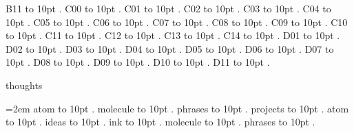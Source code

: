 \smallskip
B11 \leaders\hbox to 10pt {\hss.\hss}  \hfill {}
\smallskip
C00 \leaders\hbox to 10pt {\hss.\hss}  \hfill {}
\smallskip
C01 \leaders\hbox to 10pt {\hss.\hss}  \hfill {}
\smallskip
C02 \leaders\hbox to 10pt {\hss.\hss}  \hfill {}
\smallskip
C03 \leaders\hbox to 10pt {\hss.\hss}  \hfill {}
\smallskip
C04 \leaders\hbox to 10pt {\hss.\hss}  \hfill {}
\smallskip
C05 \leaders\hbox to 10pt {\hss.\hss}  \hfill {}
\smallskip
C06 \leaders\hbox to 10pt {\hss.\hss}  \hfill {}
\smallskip
C07 \leaders\hbox to 10pt {\hss.\hss}  \hfill {}
\smallskip
C08 \leaders\hbox to 10pt {\hss.\hss}  \hfill {}
\smallskip
C09 \leaders\hbox to 10pt {\hss.\hss}  \hfill {}
\smallskip
C10 \leaders\hbox to 10pt {\hss.\hss}  \hfill {}
\smallskip
C11 \leaders\hbox to 10pt {\hss.\hss}  \hfill {}
\smallskip
C12 \leaders\hbox to 10pt {\hss.\hss}  \hfill {}
\smallskip
C13 \leaders\hbox to 10pt {\hss.\hss}  \hfill {}
\smallskip
C14 \leaders\hbox to 10pt {\hss.\hss}  \hfill {}
\smallskip
D01 \leaders\hbox to 10pt {\hss.\hss}  \hfill {}
\smallskip
D02 \leaders\hbox to 10pt {\hss.\hss}  \hfill {}
\smallskip
D03 \leaders\hbox to 10pt {\hss.\hss}  \hfill {}
\smallskip
D04 \leaders\hbox to 10pt {\hss.\hss}  \hfill {}
\smallskip
D05 \leaders\hbox to 10pt {\hss.\hss}  \hfill {}
\smallskip
D06 \leaders\hbox to 10pt {\hss.\hss}  \hfill {}
\smallskip
D07 \leaders\hbox to 10pt {\hss.\hss}  \hfill {}
\smallskip
D08 \leaders\hbox to 10pt {\hss.\hss}  \hfill {}
\smallskip
D09 \leaders\hbox to 10pt {\hss.\hss}  \hfill {}
\smallskip
D10 \leaders\hbox to 10pt {\hss.\hss}  \hfill {}
\smallskip
D11 \leaders\hbox to 10pt {\hss.\hss}  \hfill {}
\smallskip
\par\endgroup
\bigskip
{}
thoughts
\par\begingroup
\leftskip=2em
\smallskip
atom \leaders\hbox to 10pt {\hss.\hss}  \hfill {}
\smallskip
molecule \leaders\hbox to 10pt {\hss.\hss}  \hfill {}
\smallskip
phrases \leaders\hbox to 10pt {\hss.\hss}  \hfill {}
\smallskip
projects \leaders\hbox to 10pt {\hss.\hss}  \hfill {}
\smallskip
\medskip
atom \leaders\hbox to 10pt {\hss.\hss}  \hfill {}
\smallskip
ideas \leaders\hbox to 10pt {\hss.\hss}  \hfill {}
\smallskip
ink \leaders\hbox to 10pt {\hss.\hss}  \hfill {}
\smallskip
molecule \leaders\hbox to 10pt {\hss.\hss}  \hfill {}
\smallskip
phrases \leaders\hbox to 10pt {\hss.\hss}  \hfill {}
